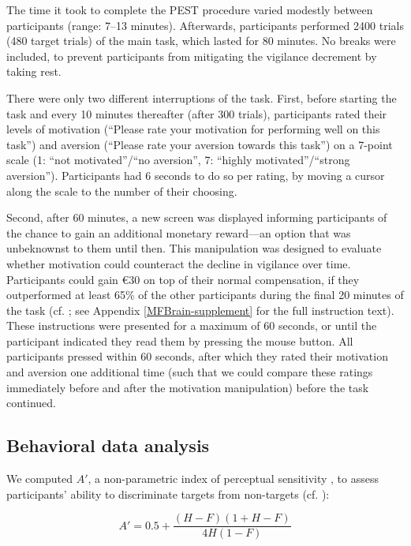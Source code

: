 \documentclass[11pt,]{memoir}
\begin{document}
The time it took to complete the PEST procedure varied modestly between participants (range: 7--13 minutes). Afterwards, participants performed 2400 trials (480 target trials) of the main task, which lasted for 80 minutes. No breaks were included, to prevent participants from mitigating the vigilance decrement by taking rest.

There were only two different interruptions of the task. First, before starting the task and every 10 minutes thereafter (after 300 trials), participants rated their levels of motivation (``Please rate your motivation for performing well on this task'') and aversion (``Please rate your aversion towards this task'') on a 7-point scale (1: ``not motivated''/``no aversion'', 7: ``highly motivated''/``strong aversion''). Participants had 6 seconds to do so per rating, by moving a cursor along the scale to the number of their choosing.

Second, after 60 minutes, a new screen was displayed informing participants of the chance to gain an additional monetary reward---an option that was unbeknownst to them until then. This manipulation was designed to evaluate whether motivation could counteract the decline in vigilance over time. Participants could gain €30 on top of their normal compensation, if they outperformed at least 65\% of the other participants during the final 20 minutes of the task (cf. \textcite{Lorist2009}; see Appendix \ref{MFBrain-supplement} for the full instruction text). These instructions were presented for a maximum of 60 seconds, or until the participant indicated they read them by pressing the mouse button. All participants pressed within 60 seconds, after which they rated their motivation and aversion one additional time (such that we could compare these ratings immediately before and after the motivation manipulation) before the task continued.

\hypertarget{behavioral-data-analysis}{%
\subsection{Behavioral data analysis}\label{behavioral-data-analysis}}

We computed \(A'\), a non-parametric index of perceptual sensitivity \autocite{Stanislaw1999}, to assess participants' ability to discriminate targets from non-targets (cf. \textcite{MacLean2009}):

\begin{equation*}
  A' = 0.5 + \frac{(H-F)(1+H-F)}{4H(1-F)}
\end{equation*}
\end{document}
